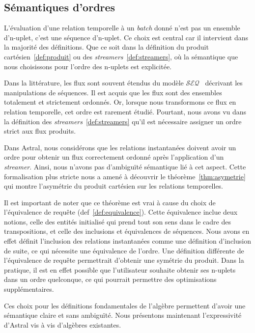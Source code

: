 \subsection{Sémantiques d'ordres}\label{sec:valid:expressivite:modele:ordres}
L'évaluation d'une relation temporelle à un \textit{batch} donné n'est pas un ensemble d'n-uplet, c'est une séquence d'n-uplet. Ce choix est central car il intervient dans la majorité des définitions. Que ce soit dans la définition du produit cartésien~\ref{def:produit} ou des \textit{streamers}~\ref{def:streamers}, où la sémantique que nous choisissons pour l'ordre des n-uplets est explicitée.

Dans la littérature, les flux sont souvent étendus du modèle $\mathcal{SEQ}$~\cite{Seshadri:seq} décrivant les manipulations de séquences. Il est acquis que les flux sont des ensembles totalement et strictement ordonnés. Or, lorsque nous transformons ce flux en relation temporelle, cet ordre est rarement étudié. Pourtant, nous avons vu dans la définition des \textit{streamers}~\ref{def:streamers} qu'il est nécessaire assigner un ordre strict aux flux produits. 

Dans Astral, nous considérons que les relations instantanées doivent avoir un ordre pour obtenir un flux correctement ordonné après l'application d'un \textit{streamer}. Ainsi, nous n'avons pas d'ambiguïté sémantique lié à cet aspect. Cette formalisation plus stricte nous a amené à découvrir le théorème~\ref{thm:asymetrie} qui montre l'asymétrie du produit cartésien sur les relations temporelles.

Il est important de noter que ce théorème est vrai à cause du choix de l'équivalence de requête (def~\ref{def:equivalence}). Cette équivalence inclue deux notions, celle des entités initialisé qui prend tout son sens dans le cadre des transpositions, et celle des inclusions et équivalences de séquences. Nous avons en effet définit l'inclusion des relations instantanées comme une définition d'inclusion de suite, ce qui nécessite une équivalence de l'ordre. Une définition différente de l'équivalence de requête permettrait d'obtenir une symétrie du produit. Dans la pratique, il est en effet possible que l'utilisateur souhaite obtenir ses n-uplets dans un ordre quelconque, ce qui pourrait permettre des optimisations supplémentaires.

Ces choix pour les définitions fondamentales de l'algèbre permettent d'avoir une sémantique claire et sans ambiguïté. Nous présentons maintenant l'expressivité d'Astral vis à vis d'algèbres existantes.
